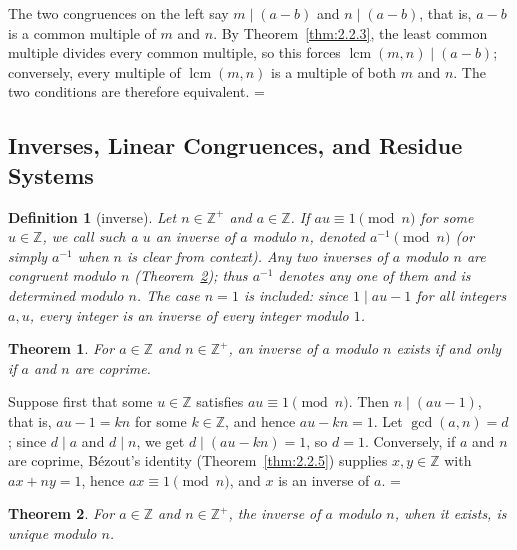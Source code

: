 \documentclass[11pt]{article}
\makeatletter
\let\nt@closedisplay\]
\def\nt@guardedclose{\@ifnextchar\par{\nt@closeafterpar}{\@ifnextchar\end{\postdisplaypenalty\@M\nt@closedisplay}{\nt@closedisplay}}}
\def\nt@closeafterpar\par{\@ifnextchar\par{\nt@closeafterpar}{\@ifnextchar\end{\postdisplaypenalty\@M\nt@closedisplay\par}{\nt@closedisplay\par}}}
\renewenvironment{proof}[1][\proofname]{\par
  \pushQED{\qed}\normalfont\topsep\medskipamount\edef\nt@afterproof{\@endparpenalty=\the\@endparpenalty\relax}\@beginparpenalty\@M\@endparpenalty\@M\let\]\nt@guardedclose\trivlist\item[]\textit{#1\@addpunct{.}} \ignorespaces}{\ifvmode\addpenalty\@M\fi\popQED\nt@afterproof\endtrivlist\@endpefalse}
\theoremstyle{ntstyle}
\newtheorem{theorem}{Theorem}[subsection]
\newtheorem{definition}{Definition}[subsection]
\DeclareMathOperator{\lcm}{lcm}
\makeatother
\begin{document}
\begin{proof} The two congruences on the left say $m \mid (a - b)$ and $n \mid (a - b)$, that is, $a - b$ is a common multiple of $m$
  and $n$. By Theorem~\ref{thm:2.2.3}, the least common multiple divides every common
  multiple, so this forces $\lcm(m, n) \mid (a - b)$;
  conversely, every multiple of $\lcm(m, n)$ is a multiple of
  both $m$ and $n$. The two conditions are therefore equivalent.
\end{proof}
\subsection{Inverses, Linear Congruences, and Residue Systems}

\begin{definition}[inverse]\label{def:3.2.1}\label{def:inverse}
  Let $n \in \mathbb{Z}^+$ and $a \in \mathbb{Z}$. If
  $au \equiv 1 \pmod{n}$ for some $u \in \mathbb{Z}$, we call such a $u$ an inverse of $a$ modulo $n$, denoted
  $a^{-1} \pmod{n}$ (or simply $a^{-1}$ when
  $n$ is clear from context). Any two inverses of $a$ modulo $n$ are
  congruent modulo $n$ (Theorem~\ref{thm:3.2.2}); thus $a^{-1}$ denotes
  any one of them and is determined modulo $n$.
  The case $n=1$ is included: since $1\mid au-1$ for all integers $a,u$,
  every integer is an inverse of every integer modulo $1$.

\end{definition}

\begin{theorem}\label{thm:3.2.1} For $a \in \mathbb{Z}$ and $n\in\mathbb{Z}^+$, an inverse of
  $a$ modulo $n$ exists if and only if $a$ and $n$ are coprime.

\end{theorem}

\begin{proof} Suppose first that some $u \in \mathbb{Z}$ satisfies
  $au \equiv 1 \pmod{n}$. Then $n \mid (au - 1)$, that is, $au - 1 = kn$
  for some $k \in \mathbb{Z}$, and hence $au - kn = 1$. Let $\gcd(a, n) = d$; since $d \mid a$ and $d \mid n$, we
  get $d \mid (au - kn) = 1$, so
  $d = 1$. Conversely, if $a$
  and $n$ are coprime, Bézout's identity (Theorem~\ref{thm:2.2.5}) supplies $x, y \in \mathbb{Z}$ with
  $ax + ny = 1$, hence $ax \equiv 1 \pmod{n}$,
  and $x$ is an inverse of $a$.
\end{proof}

\begin{theorem}\label{thm:3.2.2}\label{thm:inverse-uniqueness} For $a \in \mathbb{Z}$ and $n\in\mathbb{Z}^+$, the inverse of
  $a$ modulo $n$, when it exists, is unique modulo $n$.

\end{theorem}
\end{document}
